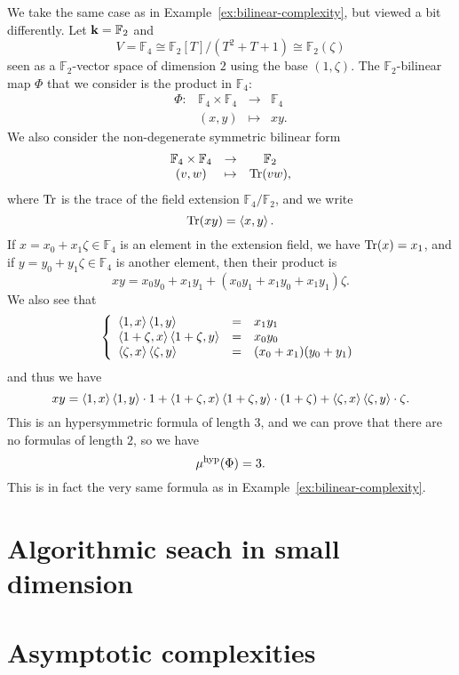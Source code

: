 \begin{ex}

  We take the same case as in Example~\ref{ex:bilinear-complexity}, but viewed
  a bit differently. Let $\mathbf{k}=\mathbb{F}_2$ and 
  \[
    V=\mathbb{F}_4\cong\mathbb{F}_2[T]/(T^2+T+1)\cong\mathbb{F}_2(\zeta)
  \]
  seen as a $\mathbb{F}_2$-vector space of dimension $2$ using the base $(1,
  \zeta)$. The $\mathbb{F}_2$-bilinear map $\Phi$ that we
  consider is the product in $\mathbb{F}_4$:
  \[
 \begin{array}{cccc}
   \Phi: & \mathbb{F}_4\times \mathbb{F}_4 &\to&\mathbb{F}_4\\
 &(x,y)&\mapsto&xy.
 \end{array}
  \]
  We also consider the non-degenerate symmetric bilinear form
\[
 \begin{array}{ccc}
   \mathbb{F}_4\times \mathbb{F}_4 &\to&\mathbb{F}_2\\
 (v,w)&\mapsto&\operatorname{Tr}(vw),
 \end{array}
\]
where $\operatorname{Tr}$ is the trace of the field extension $\mathbb{F}_4/\mathbb{F}_2$,
and we write
\[
  \operatorname{Tr}(xy) = \left\langle x,y\right\rangle.
\]
If $x = x_0 + x_1\zeta\in\mathbb{F}_4$ is an element in the extension field, we have $\operatorname{Tr}(x) = x_1$, and if $y = y_0
+ y_1\zeta\in\mathbb{F}_4$ is another element, then their product is
\[
  xy = x_0y_0 + x_1y_1 + (x_0y_1 + x_1y_0 + x_1y_1)\zeta.
\]
We also see that
\[
\left\{ 
  \begin{array}{lll}
    \left\langle1,x\right\rangle\left\langle1,y\right\rangle &=& x_1y_1 \\
    \left\langle1+\zeta,x\right\rangle\left\langle1+\zeta,y\right\rangle &=& x_0y_0 \\
    \left\langle\zeta,x\right\rangle\left\langle\zeta,y\right\rangle &=& (x_0+x_1)(y_0+y_1)
  \end{array}
\right.
\]
and thus we have
\[
  xy =
  \left\langle1,x\right\rangle\left\langle1,y\right\rangle\cdot1+\left\langle1+\zeta,x\right\rangle\left\langle1+\zeta,y\right\rangle\cdot(1+\zeta)+\left\langle\zeta,x\right\rangle\left\langle\zeta,y\right\rangle\cdot\zeta.
\]
This is an hypersymmetric formula of length $3$, and we can prove that there are
no formulas of length $2$, so we have
\[
  \mu^{\textrm{hyp}}(\Phi) = 3.
\]
This is in fact the very same formula as in
Example~\ref{ex:bilinear-complexity}.
\end{ex}

\section{Algorithmic seach in small dimension}
\section{Asymptotic complexities}

